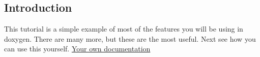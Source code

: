 

\hypertarget{intro}{}\subsection{Introduction}\label{intro}


This tutorial is a simple example of most of the features you will be using in doxygen. There are many more, but these are the most useful. Next see how you can use this yourself. \hyperlink{own}{Your own documentation}

